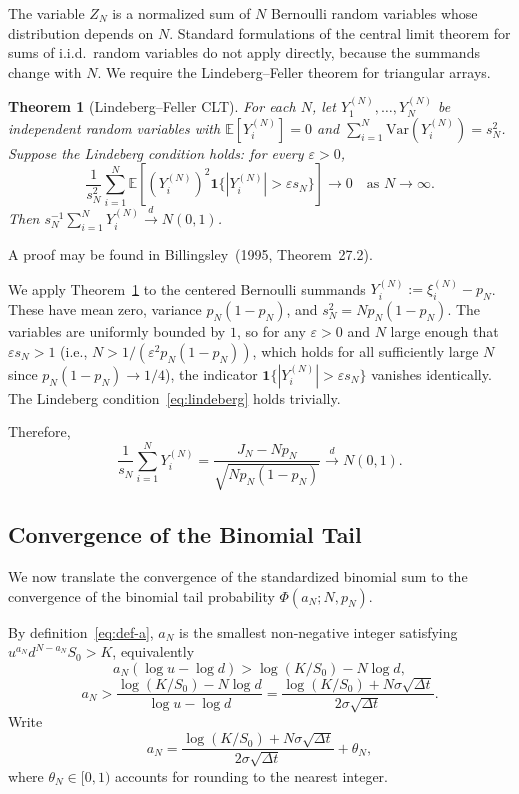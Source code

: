 \documentclass[11pt,a4paper]{article}
\newcommand{\Var}{\mathrm{Var}}
\theoremstyle{plain}
\newtheorem{theorem}{Theorem}[section]
\theoremstyle{definition}
\newcommand{\E}{\mathbb{E}}
\begin{document}
The variable $Z_N$ is a normalized sum of $N$ Bernoulli random variables
whose distribution depends on $N$. Standard formulations of the central
limit theorem for sums of i.i.d.\ random variables do not apply directly,
because the summands change with $N$. We require the
Lindeberg--Feller theorem for triangular arrays.

\begin{theorem}[Lindeberg--Feller CLT]
\label{thm:lindeberg-feller}
For each $N$, let $Y_1^{(N)}, \dots, Y_N^{(N)}$ be independent random
variables with $\E[Y_i^{(N)}] = 0$ and $\sum_{i=1}^N \Var(Y_i^{(N)}) = s_N^2$.
Suppose the Lindeberg condition holds: for every $\varepsilon > 0$,
\begin{equation}
    \label{eq:lindeberg}
    \frac{1}{s_N^2} \sum_{i=1}^N \E\!\left[
        (Y_i^{(N)})^2 \mathbf{1}\{|Y_i^{(N)}| > \varepsilon s_N\}
    \right] \to 0 \quad \text{as } N \to \infty.
\end{equation}
Then $s_N^{-1} \sum_{i=1}^N Y_i^{(N)} \xrightarrow{d} N(0, 1)$.
\end{theorem}

A proof may be found in Billingsley~(1995, Theorem~27.2).

We apply Theorem~\ref{thm:lindeberg-feller} to the centered Bernoulli
summands $Y_i^{(N)} := \xi_i^{(N)} - p_N$. These have mean zero, variance
$p_N(1 - p_N)$, and $s_N^2 = N p_N(1 - p_N)$. The variables are uniformly
bounded by $1$, so for any $\varepsilon > 0$ and $N$ large enough that
$\varepsilon s_N > 1$ (i.e., $N > 1/(\varepsilon^2 p_N(1-p_N))$, which
holds for all sufficiently large $N$ since $p_N(1-p_N) \to 1/4$), the
indicator $\mathbf{1}\{|Y_i^{(N)}| > \varepsilon s_N\}$ vanishes
identically. The Lindeberg condition~\eqref{eq:lindeberg} holds trivially.

Therefore,
\[
\frac{1}{s_N} \sum_{i=1}^N Y_i^{(N)}
= \frac{J_N - N p_N}{\sqrt{N p_N (1 - p_N)}}
\xrightarrow{d} N(0, 1).
\]

\subsection{Convergence of the Binomial Tail}
\label{subsec:tail-convergence}

We now translate the convergence of the standardized binomial sum to the
convergence of the binomial tail probability $\Phi(a_N; N, p_N)$.

By definition~\eqref{eq:def-a}, $a_N$ is the smallest non-negative
integer satisfying $u^{a_N} d^{N - a_N} S_0 > K$, equivalently
\[
a_N (\log u - \log d) > \log(K / S_0) - N \log d,
\]
\[
a_N > \frac{\log(K / S_0) - N \log d}{\log u - \log d}
   = \frac{\log(K/S_0) + N \sigma \sqrt{\Delta t}}{2 \sigma \sqrt{\Delta t}}.
\]
Write
\begin{equation}
    \label{eq:a-N-form}
    a_N = \frac{\log(K/S_0) + N \sigma \sqrt{\Delta t}}{2 \sigma \sqrt{\Delta t}} + \theta_N,
\end{equation}
where $\theta_N \in [0, 1)$ accounts for rounding to the nearest integer.
\end{document}
